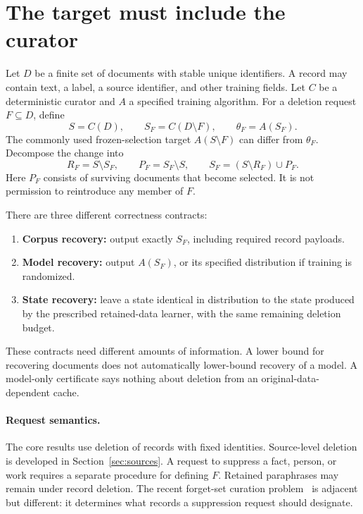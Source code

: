 \documentclass[11pt,a4paper]{article}
\theoremstyle{definition}\newtheorem{definition}[theorem]{Definition}
\newcommand{\minus}{\setminus}
\begin{document}
\section{The target must include the curator}
Let $D$ be a finite set of documents with stable unique identifiers. A record may contain text, a label, a source identifier, and other training fields. Let $C$ be a deterministic curator and $A$ a specified training algorithm. For a deletion request $F\subseteq D$, define
\begin{equation}
 S=C(D),\qquad S_F=C(D\minus F),\qquad \theta_F=A(S_F).
\end{equation}
The commonly used frozen-selection target $A(S\minus F)$ can differ from $\theta_F$. Decompose the change into
\begin{equation}
 R_F=S\minus S_F,\qquad P_F=S_F\minus S,\qquad
 S_F=(S\minus R_F)\cup P_F.
\end{equation}
Here $P_F$ consists of surviving documents that become selected. It is not permission to reintroduce any member of $F$.

There are three different correctness contracts:
\begin{enumerate}
\item \textbf{Corpus recovery:} output exactly $S_F$, including required record payloads.
\item \textbf{Model recovery:} output $A(S_F)$, or its specified distribution if training is randomized.
\item \textbf{State recovery:} leave a state identical in distribution to the state produced by the prescribed retained-data learner, with the same remaining deletion budget.
\end{enumerate}
These contracts need different amounts of information. A lower bound for recovering documents does not automatically lower-bound recovery of a model. A model-only certificate says nothing about deletion from an original-data-dependent cache.

\paragraph{Request semantics.} The core results use deletion of records with fixed identities. Source-level deletion is developed in Section~\ref{sec:sources}. A request to suppress a fact, person, or work requires a separate procedure for defining $F$. Retained paraphrases may remain under record deletion. The recent forget-set curation problem~\cite{jha2026} is adjacent but different: it determines what records a suppression request should designate.
\end{document}
